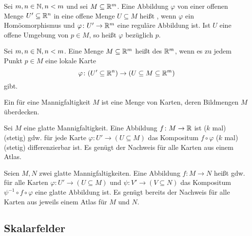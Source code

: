 \begin{definition}
Sei $m,n\in\mathbb N, n<m$ und sei $M\subseteq\mathbb R^m$.
Eine Abbildung $\varphi$ von einer offenen Menge $U'\subseteq\mathbb R^n$
in eine offene Menge $U\subseteq M$ heißt ,
wenn $\varphi$ ein Homöomorphismus und $\varphi\colon U'\to\mathbb R^m$
eine reguläre Abbildung ist. Ist $U$ eine offene Umgebung von
$p\in M$, so heißt $\varphi$  bezüglich $p$.
\end{definition}
\pagebreak[1]

\begin{definition}
Sei $m,n\in\mathbb N, n<m$. Eine Menge $M\subseteq\mathbb R^m$ heißt
 des $\mathbb R^m$, wenn
es zu jedem Punkt $p\in M$ eine lokale Karte
\begin{equation}
\varphi\colon (U'\subseteq\mathbb R^n)\to (U\subseteq M\subseteq\mathbb R^m)
\end{equation}
gibt.
\end{definition}

\begin{definition}[Atlas]
Ein  für eine Mannigfaltigkeit $M$
ist eine Menge von Karten, deren Bildmengen $M$ überdecken.
\end{definition}

\begin{definition}
Sei $M$ eine glatte Mannigfaltigkeit.
Eine Abbildung $f\colon M\to\mathbb R$ ist ($k$ mal) (stetig)
gdw. für jede Karte $\varphi\colon U'\to (U\subseteq M)$ das
Kompositum $f\circ\varphi$ ($k$ mal) (stetig) differenzierbar ist.
Es genügt der Nachweis für alle Karten aus einem Atlas.
\end{definition}

\begin{definition}
Seien $M,N$ zwei glatte Mannigfaltigkeiten.
Eine Abbildung $f\colon M\to N$ heißt 
gdw. für alle Karten $\varphi\colon U'\to (U\subseteq M)$ und
$\psi\colon V'\to (V\subseteq N)$ das Kompositum
$\psi^{-1}\circ f\circ\varphi$ eine glatte Abbildung ist.
Es genügt bereits der Nachweis für alle Karten aus jeweils einem
Atlas für $M$ und $N$.
\end{definition}

\subsection{Skalarfelder}
